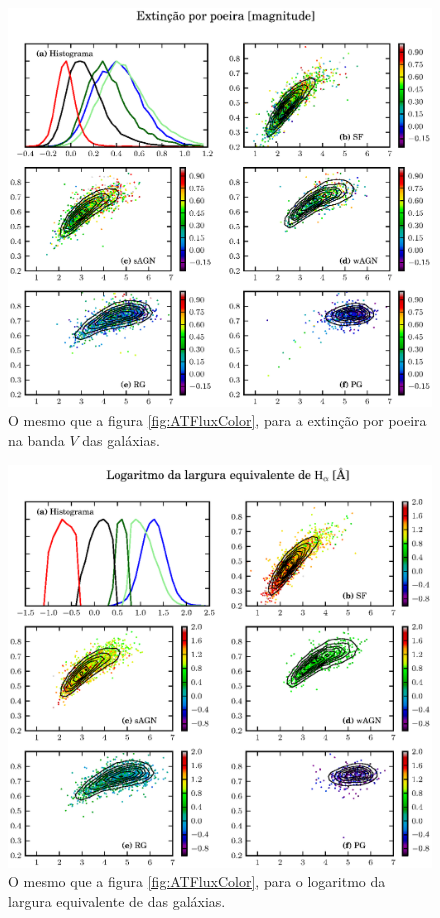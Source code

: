 \begin{figure}
	\includegraphics{figuras/uvcolor-color-AV-byclass.eps}
	\caption[Extinção por poeira no diagrama cor--cor UV.]
	{O mesmo que a figura \ref{fig:ATFluxColor}, para a extinção por
	poeira na banda $V$ das galáxias.}
	\label{fig:AVColor}
\end{figure}

\begin{figure}
	\includegraphics{figuras/uvcolor-color-halpha_ew-byclass.eps}
	\caption[Largura equivalente de \Halpha no diagrama cor--cor UV.]
	{O mesmo que a figura \ref{fig:ATFluxColor}, para o logaritmo da largura
	equivalente de \Halpha das galáxias.}
	\label{fig:EWHaColor}
\end{figure}

